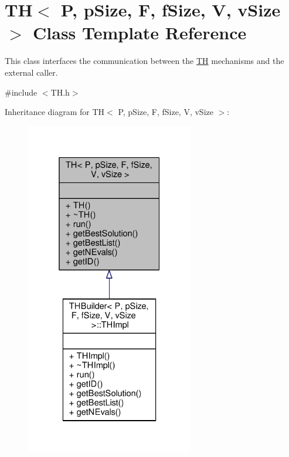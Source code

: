 \hypertarget{classTH}{}\section{TH$<$ P, p\+Size, F, f\+Size, V, v\+Size $>$ Class Template Reference}
\label{classTH}


This class interfaces the communication between the \hyperlink{classTH}{TH} mechanisms and the external caller.  




{\ttfamily \#include $<$T\+H.\+h$>$}



Inheritance diagram for TH$<$ P, p\+Size, F, f\+Size, V, v\+Size $>$\+:
\nopagebreak
\begin{figure}[H]
\begin{center}
\leavevmode
\includegraphics[width=208pt]{classTH__inherit__graph}
\end{center}
\end{figure}


